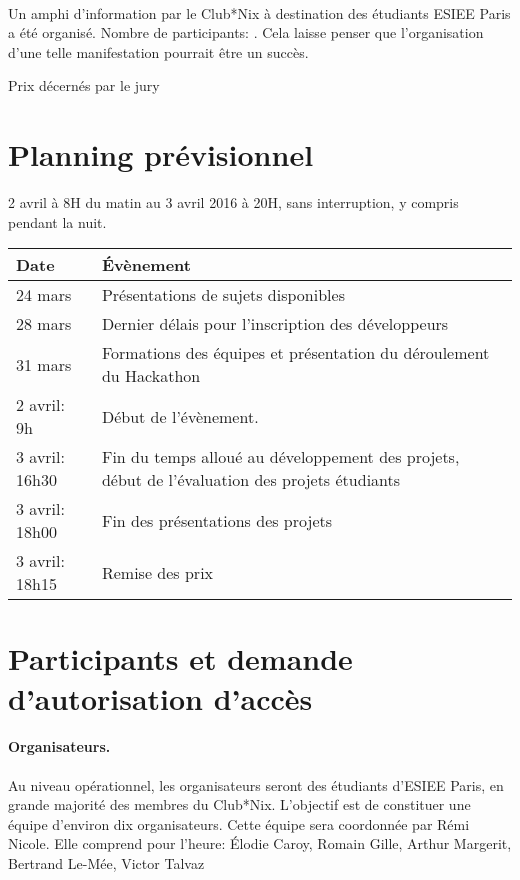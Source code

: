 \documentclass{article}
\begin{document}
\paragraph{}
Un amphi d'information par le Club*Nix à destination des étudiants ESIEE Paris
a été organisé. Nombre de participants: . Cela laisse penser que
l'organisation d'une telle manifestation pourrait être un succès.

Prix décernés par le jury

\section{Planning prévisionnel}
2 avril à 8H du matin au 3 avril 2016 à 20H, sans interruption, y compris
pendant la nuit.

\begin{center}
\begin{tabular}{lp{20em}}
	\bottomrule
	\textbf{Date}  & \textbf{Évènement}\\
	\midrule
	24 mars        & Présentations de sujets disponibles\\
	28 mars        & Dernier délais pour l'inscription des développeurs\\
	31 mars        & Formations des équipes et présentation du déroulement du
	                 Hackathon\\
	2 avril: 9h    & Début de l'évènement.\\
	3 avril: 16h30 & Fin du temps alloué au développement des projets, début de
	                 l'évaluation des projets étudiants\\
	3 avril: 18h00 & Fin des présentations des projets\\
	3 avril: 18h15 & Remise des prix\\
	\toprule
\end{tabular}
\end{center}

\section{Participants et demande d'autorisation d'accès}

\paragraph{Organisateurs.} Au niveau opérationnel, les organisateurs seront des
étudiants d'ESIEE Paris, en grande majorité des membres du Club*Nix. L'objectif
est de constituer une équipe d'environ dix organisateurs. Cette équipe sera
coordonnée par Rémi Nicole. Elle comprend pour l'heure: Élodie Caroy, Romain
Gille, Arthur Margerit, Bertrand Le-Mée, Victor Talvaz
\end{document}
